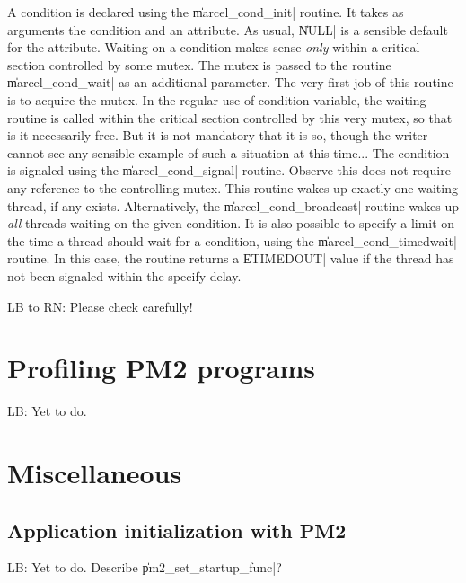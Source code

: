 A condition is declared using the \|marcel_cond_init| routine. It
takes as arguments the condition and an attribute. As usual, \|NULL|
is a sensible default for the attribute. Waiting on a condition makes
sense \emph{only} within a critical section controlled by some mutex.
The mutex is passed to the routine \|marcel_cond_wait| as an
additional parameter. The very first job of this routine is to acquire
the mutex. In the regular use of condition variable, the waiting
routine is called within the critical section controlled by this very
mutex, so that is it necessarily free. But it is not mandatory that it
is so, though the writer cannot see any sensible example of such a
situation at this time... The condition is signaled using the
\|marcel_cond_signal| routine. Observe this does not require any
reference to the controlling mutex. This routine wakes up exactly one
waiting thread, if any exists. Alternatively, the
\|marcel_cond_broadcast| routine wakes up \emph{all} threads waiting
on the given condition. It is also possible to specify a limit on the
time a thread should wait for a condition, using the
\|marcel_cond_timedwait| routine. In this case, the routine returns a
\|ETIMEDOUT| value if the thread has not been signaled within the
specify delay. 

\begin{note}
  LB to RN: Please check carefully!
\end{note}

\section{Profiling PM2 programs}
\label{sec:profiling}

\begin{note}
  LB: Yet to do. 
\end{note}

\section{Miscellaneous}

\subsection{Application initialization with PM2}
\label{sec:startupfunc}

\begin{note}
  LB: Yet to do. Describe \|pm2_set_startup_func|?
\end{note}



